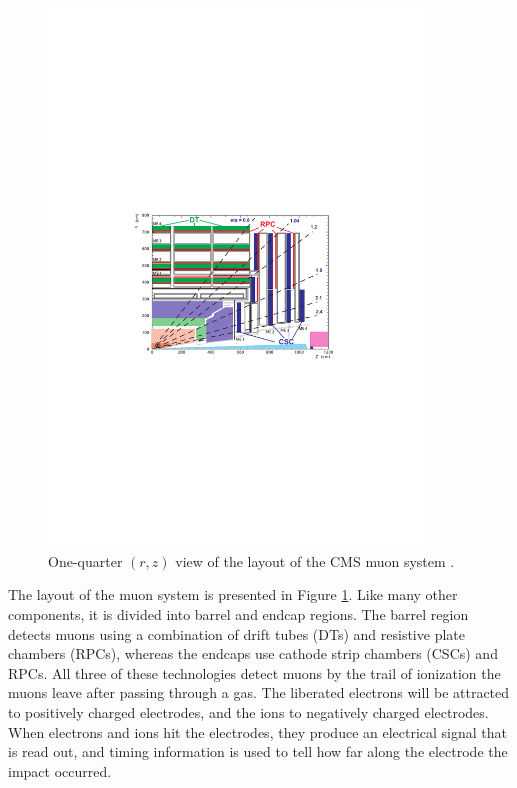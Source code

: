 \begin{figure}[htb]
\centering
\includegraphics[width=0.9\textwidth]{figures/muon-layout.pdf}
\caption[One-quarter $(r,z)$ view of the layout of the CMS muon
system.]{One-quarter $(r,z)$ view of the layout of the CMS muon system
  \cite{tdr}.}
\label{fig:cms:muon}
\end{figure}

The layout of the muon system is presented in Figure \ref{fig:cms:muon}.
Like many other components, it is divided into barrel and endcap
regions. The barrel region detects muons using a combination of drift
tubes (DTs) and resistive plate chambers (RPCs), whereas the endcaps use cathode
strip chambers (CSCs) and RPCs. All three of these technologies detect
muons by the trail of ionization the muons leave after passing through a gas. The
liberated electrons will be attracted to positively charged
electrodes, and the ions to negatively charged electrodes. When
electrons and ions hit the electrodes, they produce an electrical
signal that is read out, and timing information
is used to tell how far along the electrode the impact occurred.

